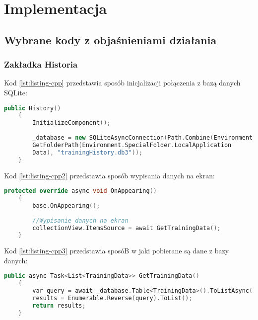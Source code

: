	\newpage
\section{Implementacja}		%

\subsection{Wybrane kody z objaśnieniami działania}		%

\subsubsection{Zakładka Historia} %

\hspace{0.60cm}Kod \ref{lst:listing-cpp} przedstawia sposób inicjalizacji połączenia z bazą danych SQLite:
\begin{lstlisting}[caption=Połączenie z bazą danych, label={lst:listing-cpp}, language=C++]
	public History()
	{
		InitializeComponent();
		
		_database = new SQLiteAsyncConnection(Path.Combine(Environment.
		GetFolderPath(Environment.SpecialFolder.LocalApplication
		Data), "trainingHistory.db3"));
	}
\end{lstlisting}

Kod \ref{lst:listing-cpp2} przedstawia sposób wypisania danych na ekran:
\begin{lstlisting}[caption=Wypisanie danych na ekran, label={lst:listing-cpp2}, language=C++]
	protected override async void OnAppearing()
	{
		base.OnAppearing();
		
		//Wypisanie danych na ekran
		collectionView.ItemsSource = await GetTrainingData();
	}
\end{lstlisting}

Kod \ref{lst:listing-cpp3} przedstawia sposóB w jaki pobierane są dane z bazy danych:
\begin{lstlisting}[caption=Pobranie danych z bazy, label={lst:listing-cpp3}, language=C++]
	public async Task<List<TrainingData>> GetTrainingData()
	{
		var query = await _database.Table<TrainingData>().ToListAsync();
		results = Enumerable.Reverse(query).ToList();
		return results;
	}
\end{lstlisting}

